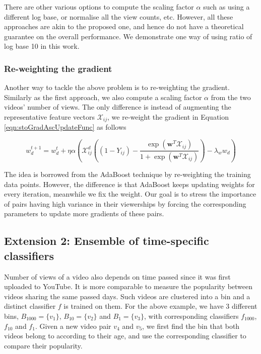 		There are other various options to compute the scaling factor $\alpha$ such as using a different log base, or normalise all the view counts, etc. However, all these approaches are akin to the proposed one, and hence do not have a theoretical guarantee on the overall performance. We demonstrate one way of using ratio of log base 10 in this work.

	\subsubsection{Re-weighting the gradient}
		Another way to tackle the above problem is to re-weighting the gradient. Similarly as the first approach, we also compute a scaling factor $\alpha$ from the two videos' number of views. The only difference is instead of augmenting the representative feature vectors $\mathcal{X}_{ij}$, we re-weight the gradient in Equation \ref{eqn:stoGradAscUpdateFunc} as follows

		\begin{equation}
		w^{t+1}_d = w^t_d + \eta \alpha (\mathcal{X}_{ij}^d ( (1 - Y_{ij}) - \frac{\exp(\textbf{w}^T\mathcal{X}_{ij})}{1 + \exp(\textbf{w}^T\mathcal{X}_{ij})})  - \lambda_w w_d)
		\label{eqn:stoGradAscUpdateFuncGeneric}
		\end{equation}

		The idea is borrowed from the AdaBoost technique by re-weighting the training data points. However, the difference is that AdaBoost keeps updating weights for every iteration, meanwhile we fix the weight. Our goal is to stress the importance of pairs having high variance in their viewerships by forcing the corresponding parameters to update more gradients of these pairs. 
	 
\subsection{Extension 2: Ensemble of time-specific classifiers}
\label{subsec:ext2}
	Number of views of a video also depends on time passed since it was first uploaded to YouTube. It is more comparable to measure the popularity between videos sharing the same passed days. Such videos are clustered into a bin and a distinct classifier $f$ is trained on them. For the above example, we have 3 different bins, $B_{1000}=\{v_1\}$, $B_{10}=\{v_2\}$ and $B_{1}=\{v_3\}$, with corresponding classifiers $f_{1000}$, $f_{10}$ and $f_{1}$. Given a new video pair $v_4$ and $v_5$, we first find the bin that both videos belong to according to their age, and use the corresponding classifier to compare their popularity. 

